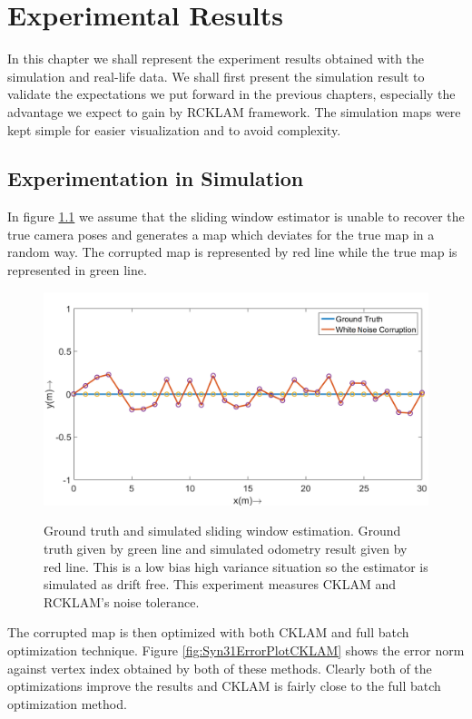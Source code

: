 \chapter{Experimental Results}
\label{chap:ExptAndResults}
  In this chapter we shall represent the experiment results obtained with the simulation and real-life data. We shall first present the simulation result to validate the expectations we put forward in the previous chapters, especially the advantage we expect to gain by RCKLAM framework. The simulation maps were kept simple for easier visualization and to avoid complexity.
  
\section{Experimentation in Simulation}
\label{sec:SimulationExpt}

  In figure \ref{fig:Syn31Map} we assume that the sliding window estimator is unable to recover the true camera poses and generates a map which deviates for the true map in a random way. The corrupted map is represented by red line while the true map is represented in green line.
  
  
\begin{figure}
  \centering
    \includegraphics[width=1.00\textwidth]{images/Syn31_map.png}
  \label{fig:Syn31Map}
  \caption{Ground truth and simulated sliding window estimation. Ground truth given by green line and simulated odometry result given by red line. This is a low bias high variance situation so the estimator is simulated as drift free. This experiment measures CKLAM and RCKLAM's noise tolerance.}
\end{figure}
  
  
  The corrupted map is then optimized with both CKLAM and full batch optimization technique. Figure \ref{fig:Syn31ErrorPlotCKLAM} shows the error norm against vertex index obtained by both of these methods. Clearly both of the optimizations improve the results and CKLAM is fairly close to the full batch optimization method. 
  
